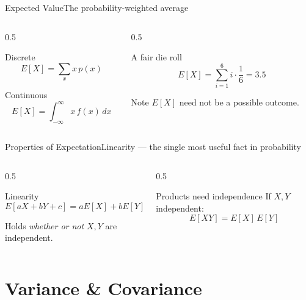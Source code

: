 \documentclass[aspectratio=169,11pt]{beamer}
\begin{document}
\begin{frame}{Expected Value}{The probability-weighted average}
  \begin{columns}[T]
    \begin{column}{0.5\textwidth}
      \begin{block}{Discrete}
        \[ E[X] = \sum_x x\,p(x) \]
      \end{block}
      \begin{block}{Continuous}
        \[ E[X] = \int_{-\infty}^{\infty} x\,f(x)\,dx \]
      \end{block}
    \end{column}
    \begin{column}{0.5\textwidth}
      \begin{exampleblock}{A fair die roll}
        \[ E[X] = \sum_{i=1}^6 i\cdot\frac16 = 3.5 \]
      \end{exampleblock}
      \small Note $E[X]$ need not be a possible outcome.
    \end{column}
  \end{columns}
\end{frame}

\begin{frame}{Properties of Expectation}{Linearity — the single most useful fact in probability}
  \begin{columns}[T]
    \begin{column}{0.5\textwidth}
      \begin{block}{Linearity}
        \[ E[aX + bY + c] = aE[X] + bE[Y] + c \]
      \end{block}
      \small Holds \emph{whether or not} $X,Y$ are independent.
    \end{column}
    \begin{column}{0.5\textwidth}
      \begin{exampleblock}{Products need independence}
        \small If $X,Y$ independent:
        \[ E[XY] = E[X]\,E[Y] \]
      \end{exampleblock}
    \end{column}
  \end{columns}
\end{frame}

\section{Variance \& Covariance}
\end{document}
